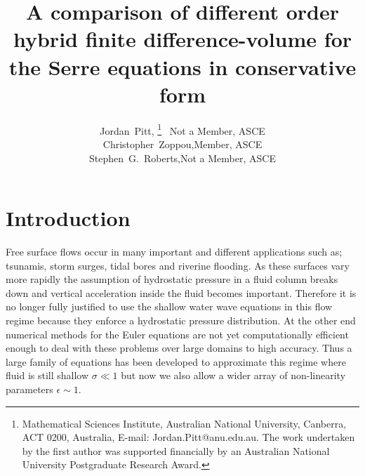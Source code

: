 \documentclass[SingleSpace,12pt]{Serre_ASCE}
\begin{document}
\title{A comparison of different order hybrid finite difference-volume for the Serre equations in conservative form}

\author{
Jordan~Pitt,%
\thanks{Mathematical Sciences Institute, Australian National University, Canberra, ACT 0200, Australia, E-mail: Jordan.Pitt@anu.edu.au. The work undertaken by the first author was supported financially by an Australian National University Postgraduate Research Award.}
\ Not a Member, ASCE
\\
Christopher~Zoppou,\footnotemark[1] Member, ASCE%
%
\\
Stephen~G.~Roberts,\footnotemark[1] Not a Member, ASCE
}

\maketitle

\begin{abstract}

\end{abstract}


\linenumbers

\section{Introduction} \label{intro}
Free surface flows occur in many important and different applications such as; tsunamis, storm surges, tidal bores and riverine flooding. As these surfaces vary more rapidly the assumption of hydrostatic pressure in a fluid column breaks down and vertical acceleration inside the fluid becomes important. Therefore it is no longer fully justified to use the shallow water wave equations in this flow regime because they enforce a hydrostatic pressure distribution. At the other end numerical methods for the Euler equations are not yet computationally efficient enough to deal with these problems over large domains to high accuracy. Thus a large family of equations has been developed to approximate this regime where fluid is still shallow $\sigma \ll 1$ but now we also allow a wider array of non-linearity parameters $\epsilon \sim 1$. 
\end{document}
